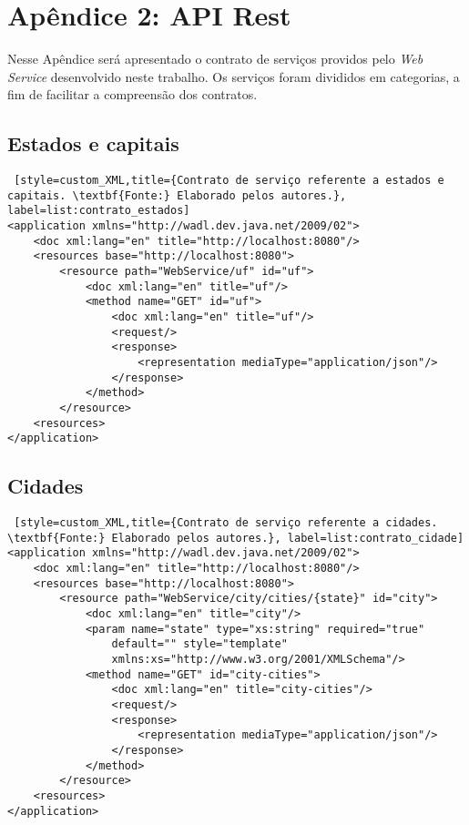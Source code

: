 \chapter*{Apêndice 2: API Rest}
\label{apendice:api_rest}

Nesse Apêndice será apresentado o contrato de serviços providos pelo \textit{Web Service} desenvolvido neste trabalho. Os serviços foram divididos em categorias, a fim de facilitar a compreensão dos contratos.

\section*{Estados e capitais}

\begin{lstlisting} [style=custom_XML,title={Contrato de serviço referente a estados e capitais. \textbf{Fonte:} Elaborado pelos autores.}, label=list:contrato_estados] 	
<application xmlns="http://wadl.dev.java.net/2009/02">
	<doc xml:lang="en" title="http://localhost:8080"/>
	<resources base="http://localhost:8080">
		<resource path="WebService/uf" id="uf">
			<doc xml:lang="en" title="uf"/>
			<method name="GET" id="uf">
				<doc xml:lang="en" title="uf"/>
				<request/>
				<response>
					<representation mediaType="application/json"/>
				</response>
			</method>
		</resource>
	<resources>
</application>
\end{lstlisting}


\section*{Cidades}

\begin{lstlisting} [style=custom_XML,title={Contrato de serviço referente a cidades. \textbf{Fonte:} Elaborado pelos autores.}, label=list:contrato_cidade] 	
<application xmlns="http://wadl.dev.java.net/2009/02">
	<doc xml:lang="en" title="http://localhost:8080"/>
	<resources base="http://localhost:8080">
		<resource path="WebService/city/cities/{state}" id="city">
			<doc xml:lang="en" title="city"/>
			<param name="state" type="xs:string" required="true" 
				default="" style="template" 
				xmlns:xs="http://www.w3.org/2001/XMLSchema"/>
			<method name="GET" id="city-cities">
				<doc xml:lang="en" title="city-cities"/>
				<request/>
				<response>
					<representation mediaType="application/json"/>
				</response>
			</method>
		</resource>
	<resources>
</application>
\end{lstlisting}


